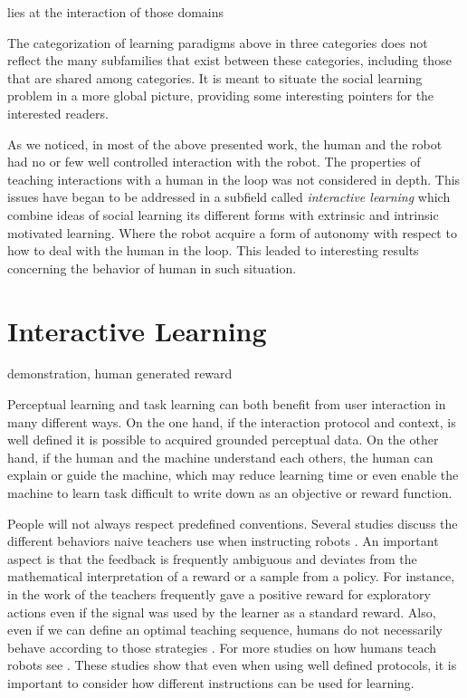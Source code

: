 lies at the interaction of those domains

The categorization of learning paradigms above in three categories does not reflect the many subfamilies that exist between these categories, including those that are shared among categories. It is meant to situate the social learning problem in a more global picture, providing some interesting pointers for the interested readers. 

As we noticed, in most of the above presented work, the human and the robot had no or few well controlled interaction with the robot. The properties of teaching interactions with a human in the loop was not considered in depth. This issues have began to be addressed in a subfield called \emph{interactive learning}  which combine ideas of social learning its different forms with extrinsic and intrinsic motivated learning. Where the robot acquire a form of autonomy with respect to how to deal with the human in the loop. This leaded to interesting results concerning the behavior of human in such situation.

\section{Interactive Learning}

demonstration, human generated reward

Perceptual learning and task learning can both benefit from user interaction in many different ways. On the one hand, if the interaction protocol and context, is well defined it is possible to acquired grounded perceptual data. On the other hand, if the human and the machine understand each others, the human can explain or guide the machine, which may reduce learning time or even enable the machine to learn task difficult to write down as an objective or reward function.


People will not always respect predefined conventions. Several studies discuss the different behaviors naive teachers use when instructing robots \cite{thomaz2008teachable,Cakmak2010optimality}. An important aspect is that the feedback is frequently ambiguous and deviates from the mathematical interpretation of a reward or a sample from a policy. For instance, in the work of \cite{thomaz2008teachable} the teachers frequently gave a positive reward for exploratory actions even if the signal was used by the learner as a standard reward. Also, even if we can define an optimal teaching sequence, humans do not necessarily behave according to those strategies \cite{Cakmak2010optimality}. For more studies on how humans teach robots see \cite{thomaz2009learning,kaochar2011towards,knox2012humans}. These studies show that even when using well defined protocols, it is important to consider how different instructions can be used for learning. 

